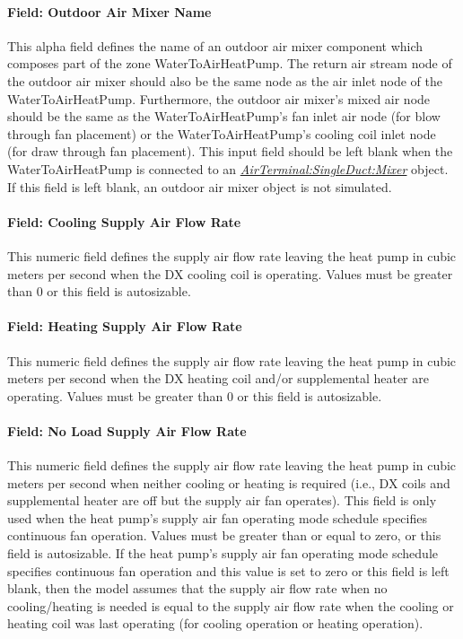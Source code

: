 \paragraph{Field: Outdoor Air Mixer Name}\label{field-outdoor-air-mixer-name-4}

This alpha field defines the name of an outdoor air mixer component which composes part of the zone WaterToAirHeatPump. The return air stream node of the outdoor air mixer should also be the same node as the air inlet node of the WaterToAirHeatPump. Furthermore, the outdoor air mixer's mixed air node should be the same as the WaterToAirHeatPump's fan inlet air node (for blow through fan placement) or the WaterToAirHeatPump's cooling coil inlet node (for draw through fan placement). This input field should be left blank when the WaterToAirHeatPump is connected to an \textit{\hyperref[airterminalsingleductmixer]{AirTerminal:SingleDuct:Mixer}} object. If this field is left blank, an outdoor air mixer object is not simulated.

\paragraph{Field: Cooling Supply Air Flow Rate}\label{field-cooling-supply-air-flow-rate-2-001}

This numeric field defines the supply air flow rate leaving the heat pump in cubic meters per second when the DX cooling coil is operating. Values must be greater than 0 or this field is autosizable.

\paragraph{Field: Heating Supply Air Flow Rate}\label{field-heating-supply-air-flow-rate-2-001}

This numeric field defines the supply air flow rate leaving the heat pump in cubic meters per second when the DX heating coil and/or supplemental heater are operating. Values must be greater than 0 or this field is autosizable.

\paragraph{Field: No Load Supply Air Flow Rate}\label{field-no-load-supply-air-flow-rate-2-001}

This numeric field defines the supply air flow rate leaving the heat pump in cubic meters per second when neither cooling or heating is required (i.e., DX coils and supplemental heater are off but the supply air fan operates). This field is only used when the heat pump's supply air fan operating mode schedule specifies continuous fan operation. Values must be greater than or equal to zero, or this field is autosizable. If the heat pump's supply air fan operating mode schedule specifies continuous fan operation and this value is set to zero or this field is left blank, then the model assumes that the supply air flow rate when no cooling/heating is needed is equal to the supply air flow rate when the cooling or heating coil was last operating (for cooling operation or heating operation).

